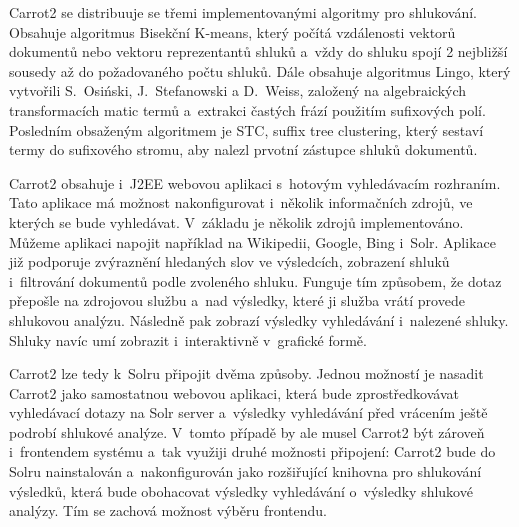 Carrot2 se distribuuje se třemi implementovanými algoritmy pro shlukování. Obsahuje algoritmus Bisekční K-means, který počítá vzdálenosti vektorů dokumentů nebo vektoru reprezentantů shluků a~vždy do shluku spojí 2 nejbližší sousedy až do požadovaného počtu shluků. Dále obsahuje algoritmus Lingo, který vytvořili S.~Osiński, J.~Stefanowski a D.~Weiss, založený na algebraických transformacích matic termů a~extrakci častých frází použitím sufixových polí. Posledním obsaženým algoritmem je STC, suffix tree clustering, který sestaví termy do sufixového stromu, aby nalezl prvotní zástupce shluků dokumentů.

Carrot2 obsahuje i~J2EE webovou aplikaci s~hotovým vyhledávacím rozhraním. Tato aplikace má možnost nakonfigurovat i~několik informačních zdrojů, ve kterých se bude vyhledávat. V~základu je několik zdrojů implementováno. Můžeme aplikaci napojit například na Wikipedii, Google, Bing i~Solr. Aplikace již podporuje zvýraznění hledaných slov ve výsledcích, zobrazení shluků i~filtrování dokumentů podle zvoleného shluku. Funguje tím způsobem, že dotaz přepošle na zdrojovou službu a~nad výsledky, které ji služba vrátí provede shlukovou analýzu. Následně pak zobrazí výsledky vyhledávání i~nalezené shluky. Shluky navíc umí zobrazit i~interaktivně v~grafické formě.

Carrot2 lze tedy k~Solru připojit dvěma způsoby. Jednou možností je nasadit Carrot2 jako samostatnou webovou aplikaci, která bude zprostředkovávat vyhledávací dotazy na Solr server a~výsledky vyhledávání před vrácením ještě podrobí shlukové analýze. V~tomto případě by ale musel Carrot2 být zároveň i~frontendem systému a~tak využiji druhé možnosti připojení: Carrot2 bude do Solru nainstalován a~nakonfigurován jako rozšiřující knihovna pro shlukování výsledků, která bude obohacovat výsledky vyhledávání o~výsledky shlukové analýzy. Tím se zachová možnost výběru frontendu.